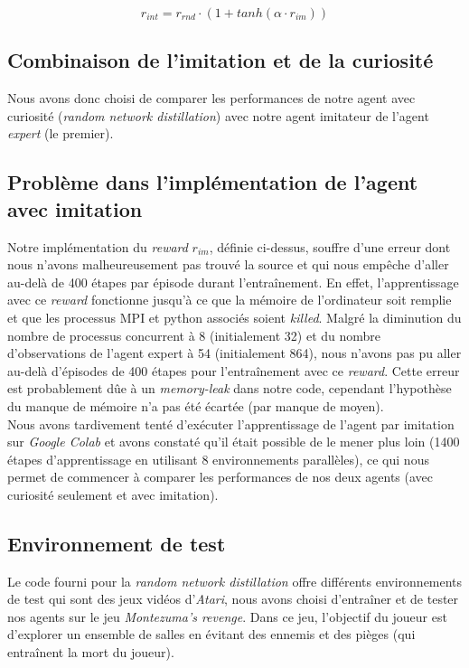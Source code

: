 \documentclass[a4paper,12pt]{report}
\begin{document}
\begin{equation} r_{int} = r_{rnd} \cdot (1 + tanh(\alpha \cdot r_{im})) \end{equation}

\subsection{Combinaison de l'imitation et de la curiosité}
Nous avons donc choisi de comparer les performances de notre agent avec curiosité (\textit{random network distillation}) avec notre agent imitateur de l'agent \textit{expert} (le premier).

\subsection{Problème dans l'implémentation de l'agent avec imitation}
\indent Notre implémentation du \textit{reward} $r_{im}$, définie ci-dessus, souffre d'une erreur dont nous n'avons malheureusement pas trouvé la source et qui nous empêche d'aller au-delà de 400 étapes par épisode durant l'entraînement.
En effet, l'apprentissage avec ce \textit{reward} fonctionne jusqu'à ce que la mémoire de l'ordinateur soit remplie et que les processus MPI et python associés soient \textit{killed}.
Malgré la diminution du nombre de processus concurrent à 8 (initialement 32) et du nombre d'observations de l'agent expert à 54 (initialement 864), nous n'avons pas pu aller au-delà d'épisodes de 400 étapes pour l'entraînement avec ce \textit{reward}. Cette erreur est probablement dûe à un \textit{memory-leak} dans notre code, cependant l'hypothèse du manque de mémoire n'a pas été écartée (par manque de moyen).\\

\indent Nous avons tardivement tenté d'exécuter l'apprentissage de l'agent par imitation sur \textit{Google Colab} et avons constaté qu'il était possible de le mener plus loin (1400 étapes d'apprentissage en utilisant 8 environnements parallèles), ce qui nous permet de commencer à comparer les performances de nos deux agents (avec curiosité seulement et avec imitation).

\subsection{Environnement de test}
Le code fourni pour la \textit{random network distillation} offre différents environnements de test qui sont des jeux vidéos d'\textit{Atari}, nous avons choisi d'entraîner et de tester nos agents sur le jeu \textit{Montezuma's revenge}\cite{montezuma}. Dans ce jeu, l'objectif du joueur est d'explorer un ensemble de salles en évitant des ennemis et des pièges (qui entraînent la mort du joueur).
\end{document}
